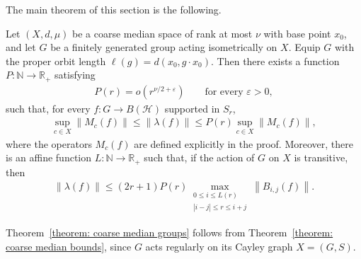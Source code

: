 \documentclass[12pt,reqno]{amsart}
\newcommand{\N}{\mathbb{N}}
\newcommand{\norm}[1]{\left\|#1\right\|}
\newcommand{\R}{\mathbb{R}}
\newcommand{\Hil}{\mathcal{H}}
\numberwithin{equation}{section}
\begin{document}
The main theorem of this section is the following.
\begin{theorem}\label{theorem: coarse median bounds}
    Let $(X,d,\mu)$ be a coarse median space of rank at most $\nu$ with base point $x_0$, and let $G$ be a finitely generated group acting isometrically on $X$. Equip $G$ with the proper orbit length $\ell(g)=d(x_0,g\cdot x_0)$. Then there exists a function $P:\N\to\R_+$ satisfying
    \begin{align*}
        P(r)=o(r^{\nu/2+\varepsilon})\qquad\text{for every }\varepsilon>0,
    \end{align*}
    such that, for every $f:G\to B(\Hil)$ supported in $S_r$,
    \begin{align*}
        \sup_{c\in  X}\norm{M_{c}(f)}\le \norm{\lambda(f)}\le P(r)\sup_{c\in X}\norm{M_{c}(f)},
    \end{align*}
    where the operators $M_c(f)$ are defined explicitly in the proof.
    Moreover, there is an affine function $L:\N\to\R_+$ such that, if the action of $G$ on $X$ is transitive, then
    \begin{align*}
        \norm{\lambda(f)}\le (2r+1)P(r)\max_{\substack{0\le i\le L(r)\\ |i-j|\le r \le i+j}}\norm{B_{i,j}(f)}.
    \end{align*}
\end{theorem}
Theorem~\ref{theorem: coarse median groups} follows from Theorem~\ref{theorem: coarse median bounds}, since $G$ acts regularly on its Cayley graph $X=(G,S)$.
\end{document}
